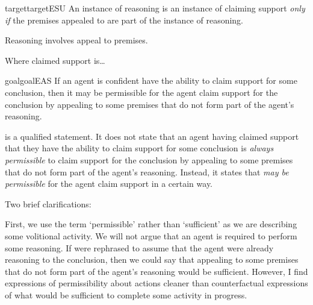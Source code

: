 \begin{note}
  \begin{restatable}{target}{targetESU}
    \label{denied-claim}
    An instance of reasoning is an instance of claiming support \emph{only if} the premises appealed to are part of the instance of reasoning.
  \end{restatable}
  {\color{red} Reasoning involves appeal to premises.}
\end{note}

\begin{note}
  Where claimed support is\dots
\end{note}

\begin{note}
  \begin{restatable}{goal}{goalEAS}
    \label{prop:EAS}
    If an agent is confident have the ability to claim support for some conclusion, then it may be permissible for the agent claim support for the conclusion by appealing to some premises that do not form part of the agent's reasoning.
  \end{restatable}

  \EAS{} is a qualified statement.
  It does not state that an agent having claimed support that they have the ability to claim support for some conclusion is \emph{always permissible} to claim support for the conclusion by appealing to some premises that do not form part of the agent's reasoning.
  Instead, it states that \emph{may be permissible} for the agent claim support in a certain way.

  Two brief clarifications:
\end{note}

\begin{note}
  First, we use the term `permissible' rather than `sufficient' as we are describing some volitional activity.
  We will not argue that an agent is required to perform some reasoning.
  If \EAS{} were rephrased to assume that the agent were already reasoning to the conclusion, then we could say that appealing to some premises that do not form part of the agent's reasoning would be sufficient.
  However, I find expressions of permissibility about actions cleaner than counterfactual expressions of what would be sufficient to complete some activity in progress.
\end{note}

